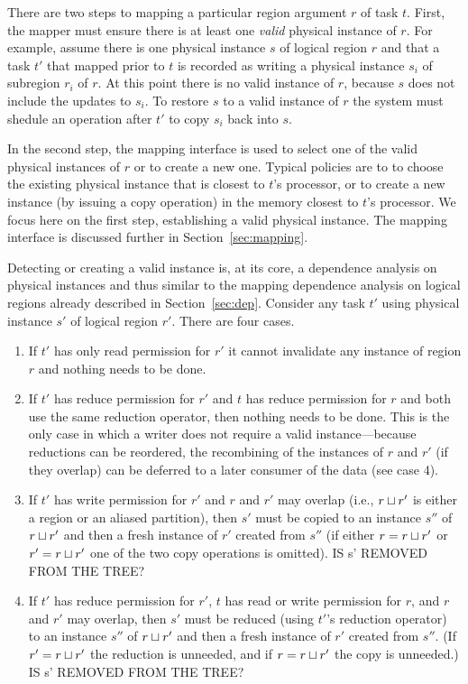 There are two steps to mapping a particular region argument $r$ of
task $t$.  First, the mapper must ensure there is at least one {\em valid}
physical instance of $r$.  For example, assume there is one physical instance $s$ of
logical region $r$ and that a task $t'$ that mapped prior to $t$ is recorded as writing a
physical instance $s_i$ of subregion $r_i$ of $r$.  At this point there
is no valid instance of $r$, because $s$ does not include
the updates to $s_i$.  To restore $s$ to a valid instance of $r$ the
system must shedule an operation after $t'$ to copy
$s_i$ back into $s$.  

In the second step, the mapping interface is used to select one of the
valid physical instances of $r$ or to create a new one.  Typical
policies are to to choose the existing physical instance that is
closest to $t$'s processor, or to create a new instance (by issuing a
copy operation) in the memory closest to $t$'s processor.
We focus here on the first step, establishing a valid physical instance.
The mapping interface is discussed further in Section~\ref{sec:mapping}.

Detecting or creating a valid instance is, at its core, a dependence analysis on
physical instances and thus similar to the mapping dependence analysis on logical
regions already described in Section~\ref{sec:dep}.  Consider any task $t'$ using
physical instance $s'$ of logical region $r'$.  There are four cases.
\begin{enumerate}
\item If $t'$ has only read permission
for $r'$ it cannot invalidate any instance of region $r$ and nothing needs to be done.

\item If $t'$ has reduce permission for $r'$ and $t$ has reduce
  permission for $r$ and both use the same reduction operator, then
  nothing needs to be done.  This is the only case in which a writer
  does not require a valid instance---because reductions can be
  reordered, the recombining of the instances of $r$ and $r'$ (if they
  overlap) can be deferred to a later consumer of the data (see case
  4).

\item If $t'$ has write permission for $r'$ and $r$ and $r'$ may
  overlap (i.e., $r \sqcup r'$ is either a region or an aliased
  partition), then $s'$ must be copied to an instance $s''$ of
  $r \sqcup r'$ and then a fresh instance of $r'$ created from $s''$
  (if either $r = r \sqcup r'$ or $r' = r \sqcup r'$ one of the two
  copy operations is omitted).
 IS s' REMOVED FROM THE TREE?

\item If $t'$ has reduce permission for $r'$, $t$ has read or write
  permission for $r$, and $r$ and $r'$ may overlap, then $s'$ must be
  reduced (using $t'$'s reduction operator) to an instance $s''$ of
  $r \sqcup r'$ and then a fresh instance of $r'$ created from $s''$.
  (If $r' = r \sqcup r'$ the reduction is unneeded, and if $r =
  r \sqcup r'$ the copy is unneeded.)
 IS s' REMOVED FROM THE TREE?
\end{enumerate}

